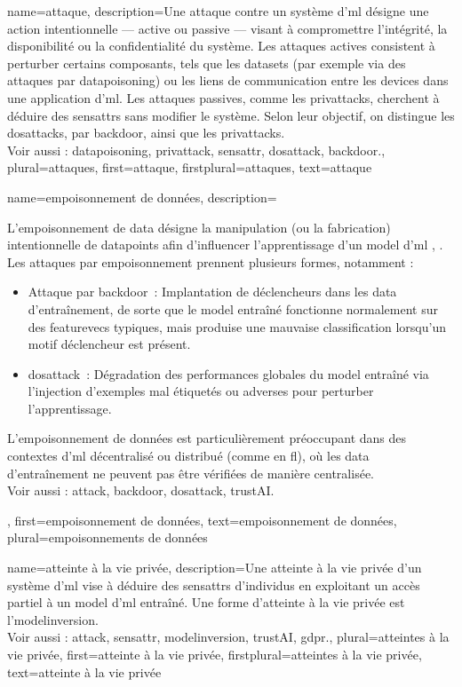 {name={attaque},  
	description={Une attaque contre un système d’\gls{ml} désigne une action intentionnelle — 
		active ou passive — visant à compromettre l’intégrité, la disponibilité ou la confidentialité du système. 
		Les attaques actives consistent à perturber certains composants, tels que les \glspl{dataset} 
		(par exemple via des attaques par \gls{datapoisoning}) ou les liens de communication entre les 
		\glspl{device} dans une application d’\gls{ml}. Les attaques passives, comme les \glspl{privattack}, 
		cherchent à déduire des \glspl{sensattr} sans modifier le système. Selon leur objectif, on distingue 
		les \glspl{dosattack}, par \gls{backdoor}, ainsi que les \glspl{privattack}.
		\\
		Voir aussi : \gls{datapoisoning}, \gls{privattack}, \gls{sensattr}, \gls{dosattack}, \gls{backdoor}.},
	plural={attaques}, 
	first={attaque},
	firstplural={attaques},
	text={attaque}
}

{name={empoisonnement de données}, 
	description={L’empoisonnement de \gls{data} désigne la manipulation 
		(ou la fabrication) intentionnelle de \glspl{datapoint} afin d'influencer l’apprentissage d’un \gls{model} d’\gls{ml} \cite{Liu2021}, \cite{PoisonGAN}. 
		Les attaques par empoisonnement prennent plusieurs formes, notamment :
		\begin{itemize}
			\item Attaque par \gls{backdoor}~: Implantation de déclencheurs dans les \gls{data} d’entraînement, de sorte que 
			le \gls{model} entraîné fonctionne normalement sur des \glspl{featurevec} typiques, 
			mais produise une mauvaise \gls{classification} lorsqu’un motif déclencheur est présent.
			\item \Gls{dosattack}~: Dégradation des performances globales du \gls{model} entraîné via l’injection 
			d’exemples mal étiquetés ou adverses pour perturber l’apprentissage.
		\end{itemize}
		L’empoisonnement de données est particulièrement préoccupant dans des contextes d’\gls{ml} décentralisé ou distribué 
		(comme en \gls{fl}), où les \gls{data} d’entraînement ne peuvent pas être vérifiées de manière centralisée.
		\\
		Voir aussi : \gls{attack}, \gls{backdoor}, \gls{dosattack}, \gls{trustAI}.},
	first={empoisonnement de données},
	text={empoisonnement de données}, plural={empoisonnements de données}
}

{name={atteinte à la vie privée},
	description={Une atteinte à la vie privée d’un système d'\gls{ml} vise à déduire des \glspl{sensattr} d’individus en exploitant un accès partiel à un \gls{model} d'\gls{ml} entraîné.  
		Une forme d’atteinte à la vie privée est l’\gls{modelinversion}.\\
		Voir aussi : \gls{attack}, \gls{sensattr}, \gls{modelinversion}, \gls{trustAI}, \gls{gdpr}.},
	plural={atteintes à la vie privée}, 
	first={atteinte à la vie privée},
	firstplural={atteintes à la vie privée}, 
	text={atteinte à la vie privée}
}

